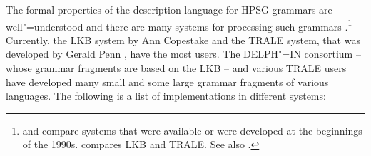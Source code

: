 The formal properties of the description language for HPSG grammars are well"=understood and there are
many systems for processing such grammars
\citep*{DS91a,%
DD93a-u,%
PV91a-u,%
DISCO94,%
%
Erbach95a,%
Schuetz96,STRD96a-u,%
SRTD96a,%
UBCCDDEEMMO-96a,Babel,Mueller2004b,%
CP96,PC99,%
GMG97a-u,%
Copestake2002a,%
Callmeier00a-u,%
Dahlloef2003a-u,%
MPR2002a-u,Penn2004a-u,%
Mueller2007b,%
Sato2008a-u,%
Kaufmann2009a-u%
}.\footnote{
\citet{UBCCDDEEMMO-96a} and \citet{Bolc:Czuba:ea:96a-u} compare systems that were available or were
developed at the beginnings of the 1990s. \citet{MelnikHandWritten}
compares LKB and TRALE. See also .
}
Currently, the LKB system by Ann Copestake and the TRALE
system, that was developed by Gerald Penn \citep*{MPR2002a-u,Penn2004a-u}, have the most users. The
DELPH"=IN consortium -- whose grammar fragments are based on the LKB -- and various TRALE users have developed many small and some
large grammar fragments of various languages. The following is a list of implementations in different systems:
